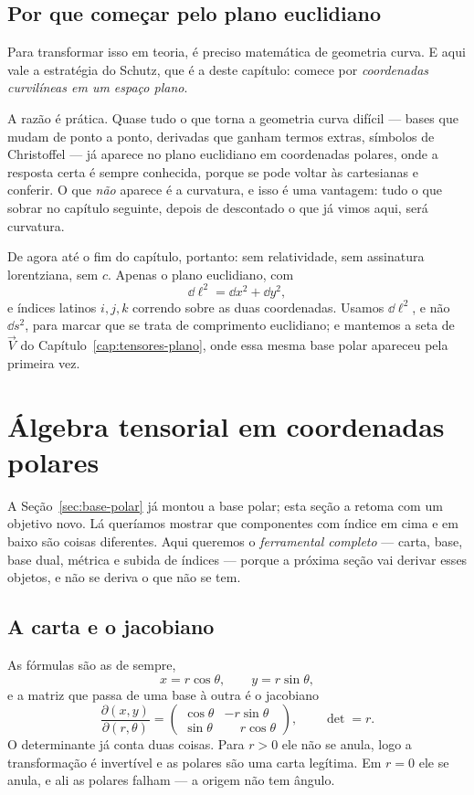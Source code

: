 \documentclass[12pt,a4paper,oneside]{book}
\theoremstyle{rgplain}
\theoremstyle{rgremark}
\begin{document}
\subsection*{Por que começar pelo plano euclidiano}

Para transformar isso em teoria, é preciso matemática de geometria curva. E
aqui vale a estratégia do Schutz, que é a deste capítulo: comece por
\emph{coordenadas curvilíneas em um espaço plano}.

A razão é prática. Quase tudo o que torna a geometria curva difícil --- bases
que mudam de ponto a ponto, derivadas que ganham termos extras, símbolos de
Christoffel --- já aparece no plano euclidiano em coordenadas polares, onde a
resposta certa é sempre conhecida, porque se pode voltar às cartesianas e
conferir. O que \emph{não} aparece é a curvatura, e isso é uma vantagem: tudo
o que sobrar no capítulo seguinte, depois de descontado o que já vimos aqui,
será curvatura.

De agora até o fim do capítulo, portanto: sem relatividade, sem assinatura
lorentziana, sem $c$. Apenas o plano euclidiano, com
\[
  \dd\ell^2=\dd x^2+\dd y^2 ,
\]
e índices latinos $i,j,k$ correndo sobre as duas coordenadas. Usamos
$\dd\ell^2$, e não $\dd s^2$, para marcar que se trata de comprimento
euclidiano; e mantemos a seta de $\vec V$ do Capítulo~\ref{cap:tensores-plano},
onde essa mesma base polar apareceu pela primeira vez.

\section{Álgebra tensorial em coordenadas polares}
\label{sec:algebra-polar}

A Seção~\ref{sec:base-polar} já montou a base polar; esta seção a retoma com
um objetivo novo. Lá queríamos mostrar que componentes com índice em cima e em
baixo são coisas diferentes. Aqui queremos o \emph{ferramental completo} ---
carta, base, base dual, métrica e subida de índices --- porque a próxima seção vai
derivar esses objetos, e não se deriva o que não se tem.

\subsection*{A carta e o jacobiano}

As fórmulas são as de sempre,
\begin{equation}
  x=r\cos\theta,\qquad y=r\sin\theta ,
  \label{eq:carta-polar}
\end{equation}
e a matriz que passa de uma base à outra é o jacobiano
\[
  \frac{\partial(x,y)}{\partial(r,\theta)}
  =\begin{pmatrix}
    \cos\theta & -r\sin\theta\\
    \sin\theta & \phantom{-}r\cos\theta
  \end{pmatrix},
  \qquad
  \det=r .
\]
O determinante já conta duas coisas. Para $r>0$ ele não se anula, logo a
transformação é invertível e as polares são uma carta legítima. Em $r=0$ ele
se anula, e ali as polares falham --- a origem não tem ângulo.
\end{document}
